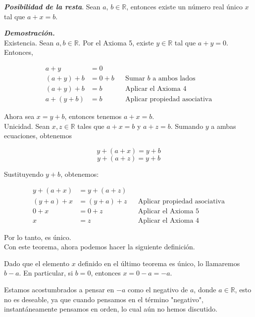 \documentclass{report}
\begin{document}
    \begin{thBox}
        \textit{\textbf{Posibilidad de la resta}}. Sean $a$, $b \in \mathbb{R}$, entonces existe un número real único $x$ tal que $a+x=b$.
    \end{thBox}
    
    \textit{\textbf{Demostración.}}\\
    
    Existencia. Sean $a, b \in \mathbb{R}$. Por el Axioma 5, existe $y \in \mathbb{R}$ tal que $a+y = 0$. Entonces,
    
    \begin{align*}
        a+y &= 0\\
        (a+y) + b &= 0 +b &&\text{Sumar } b \text{ a ambos lados}\\
        (a+y) + b &= b &&\text{Aplicar el Axioma 4}\\
        a+(y+b) &= b && \text{Aplicar propiedad asociativa}
    \end{align*}
    
    Ahora sea $x = y+b$, entonces tenemos $a+x=b$.\\
    
    Unicidad. Sean $x,z \in \mathbb{R}$ tales que $a+x=b$ y $a+z=b$. Sumando $y$ a ambas ecuaciones, obtenemos
    
    $$y+(a+x)=y+b$$
    $$y+(a+z)=y+b$$
    
    Sustituyendo $y+b$, obtenemos:
    
    \begin{align*}
        y+(a+x) &= y+(a+z)\\
        (y+a)+x &= (y+a)+z && \text{Aplicar propiedad asociativa}\\
        0+x &= 0+z && \text{Aplicar el Axioma 5}\\
        x &= z && \text{Aplicar el Axioma 4}
    \end{align*}
    
    Por lo tanto, es único.\\
    
    Con este teorema, ahora podemos hacer la siguiente definición.
    
    \begin{defBox}
        Dado que el elemento $x$ definido en el último teorema es único, lo llamaremos $b-a$. En particular, si $b=0$, entonces $x=0-a=-a$.
    \end{defBox}
    
    \begin{asideBox}
        Estamos acostumbrados a pensar en $-a$ como el negativo de $a$, donde $a \in \mathbb{R}$, esto no es deseable, ya que cuando pensamos en el término "negativo", instantáneamente pensamos en orden, lo cual aún no hemos discutido.
    \end{asideBox}
    
\end{document}
